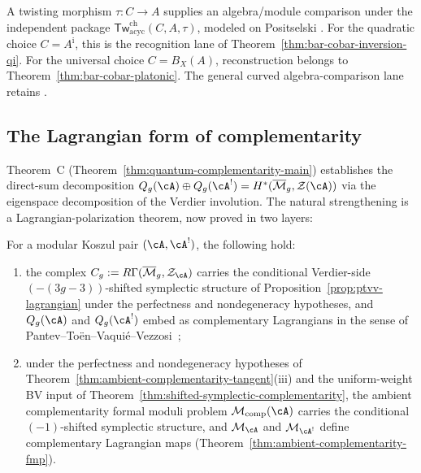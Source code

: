 A twisting morphism \(\tau\colon C\to A\) supplies an algebra/module
comparison under the independent package
\(\mathsf{Tw}^{\mathrm{ch}}_{\mathrm{acyc}}(C,A,\tau)\), modeled on
Positselski \cite[Theorem~6.5]{Positselski11}.  For the quadratic
choice \(C=A^{\mathrm i}\), this is the recognition lane of
Theorem~\ref{thm:bar-cobar-inversion-qi}.  For the universal choice
\(C=B_X(A)\), reconstruction belongs to
Theorem~\ref{thm:bar-cobar-platonic}.  The general curved
algebra-comparison lane retains \ClaimStatusOpen.

\subsection{The Lagrangian form of complementarity}

Theorem~C (Theorem~\ref{thm:quantum-complementarity-main}) establishes
the direct-sum decomposition
$Q_g(\cA) \oplus Q_g(\cA^!)
= H^*(\overline{\mathcal{M}}_g, \mathcal{Z}(\cA))$
via the eigenspace decomposition of the Verdier involution.
The natural strengthening is a Lagrangian-polarization theorem,
now proved in two layers:

\begin{theorem}\label{thm:lagrangian-complementarity}
For a modular Koszul pair $(\cA, \cA^!)$, the following hold:
\begin{enumerate}[label=\textup{(\roman*)}]
\item the complex
 $C_g := R\Gamma(\overline{\mathcal{M}}_g, \mathcal{Z}_{\cA})$
 carries the conditional Verdier-side
 $(-(3g{-}3))$-shifted symplectic structure of
 Proposition~\textup{\ref{prop:ptvv-lagrangian}} under the
 perfectness and nondegeneracy hypotheses, and
 $Q_g(\cA)$ and $Q_g(\cA^!)$ embed as complementary
 Lagrangians in the sense of
 Pantev--To\"en--Vaqui\'e--Vezzosi~\cite{PTVV13};
\item under the perfectness and nondegeneracy hypotheses of
 Theorem~\textup{\ref{thm:ambient-complementarity-tangent}(iii)}
 and the uniform-weight BV input of
 Theorem~\textup{\ref{thm:shifted-symplectic-complementarity}},
 the ambient complementarity formal moduli problem
 $\mathcal{M}_{\mathrm{comp}}(\cA)$
 carries the conditional $(-1)$-shifted symplectic structure, and
 $\mathcal{M}_{\cA}$ and $\mathcal{M}_{\cA^!}$ define
 complementary Lagrangian maps
 \textup{(}Theorem~\textup{\ref{thm:ambient-complementarity-fmp}}\textup{)}.
\end{enumerate}
\end{theorem}

